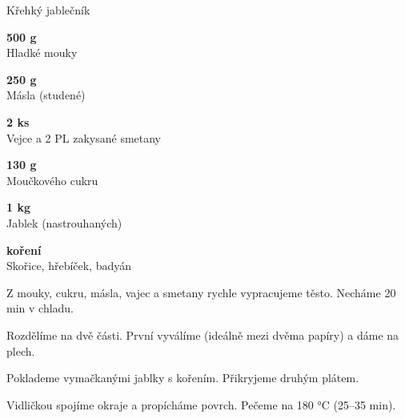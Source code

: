 \documentclass[11pt,a4paper]{article}
\begin{document}
\begin{recipe}[Sienna]{Křehký jablečník}
    \begin{ingredients}
        \item \parbox[t]{\linewidth}{\raggedright \weight \textbf{500 g}\\ Hladké mouky}
        \item \parbox[t]{\linewidth}{\raggedright \weight \textbf{250 g}\\ Másla (studené)}
        \item \parbox[t]{\linewidth}{\raggedright \piece \textbf{2 ks}\\ Vejce a 2 PL zakysané smetany}
        \item \parbox[t]{\linewidth}{\raggedright \weight \textbf{130 g}\\ Moučkového cukru}
        \item \parbox[t]{\linewidth}{\raggedright \weight \textbf{1 kg}\\ Jablek (nastrouhaných)}
        \item \parbox[t]{\linewidth}{\raggedright \indefinite \textbf{koření}\\ Skořice, hřebíček, badyán}
    \end{ingredients}
    \begin{steps}
        \item Z mouky, cukru, másla, vajec a smetany rychle vypracujeme těsto. Necháme 20 min v chladu.
        \item Rozdělíme na dvě části. První vyválíme (ideálně mezi dvěma papíry) a dáme na plech.
        \item Poklademe vymačkanými jablky s kořením. Přikryjeme druhým plátem.
        \item Vidličkou spojíme okraje a propícháme povrch. Pečeme na 180 °C (25–35 min).
    \end{steps}
\end{recipe}
\end{document}
